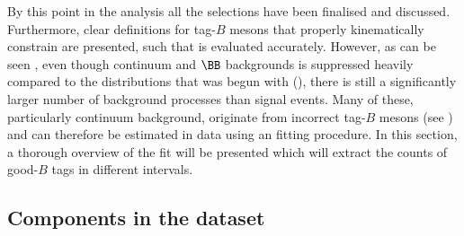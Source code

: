 By this point in the analysis all the selections have been finalised and discussed.
Furthermore, clear definitions for tag-$B$ mesons that properly kinematically constrain \BtoXsgamma are presented, such that \EB is evaluated accurately.
However, as can be seen , even though continuum and $\BB$ backgrounds is suppressed heavily compared to the \EB distributions that was begun with (),
there is still a significantly larger number of background processes than \BtoXsgamma signal events.
Many of these, particularly continuum background, originate from incorrect tag-$B$ mesons (see ) and can therefore be estimated in data using an \Mbc fitting procedure.
In this section, a thorough overview of the \Mbc fit will be presented which will extract the counts of good-$B$ tags in different \EB intervals.

\subsection{Components in the dataset}\label{sec:fitting_components}

